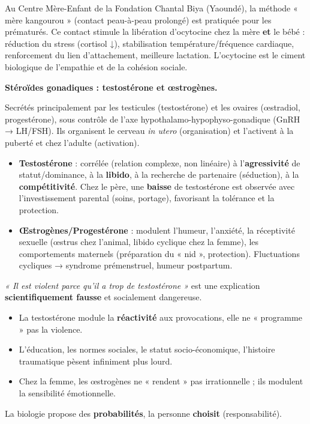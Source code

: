 \documentclass[11pt]{article}
\newcommand{\cle}[1]{{\popxbold\color{popdark}#1}}
\begin{document}
\begin{exemplebox}
Au Centre Mère-Enfant de la Fondation Chantal Biya (Yaoundé), la méthode « mère kangourou » (contact peau-à-peau prolongé) est pratiquée pour les prématurés. Ce contact stimule la libération d'ocytocine chez la mère \textbf{et} le bébé : réduction du stress (cortisol ↓), stabilisation température/fréquence cardiaque, renforcement du lien d'attachement, meilleure lactation. L'ocytocine est le ciment biologique de l'empathie et de la cohésion sociale.
\end{exemplebox}

\textbf{Stéroïdes gonadiques : testostérone et œstrogènes.}\par

Secrétés principalement par les \cle{testicules} (testostérone) et les \cle{ovaires} (œstradiol, progestérone), sous contrôle de l'axe \cle{hypothalamo-hypophyso-gonadique} (GnRH → LH/FSH). Ils organisent le cerveau \emph{in utero} (organisation) et l'activent à la puberté et chez l'adulte (activation).

\begin{propriete}
\begin{itemize}
    \item \textbf{Testostérone} : corrélée (relation complexe, non linéaire) à l'\textbf{agressivité} de statut/dominance, à la \textbf{libido}, à la recherche de partenaire (séduction), à la \textbf{compétitivité}. Chez le père, une \textbf{baisse} de testostérone est observée avec l'investissement parental (soins, portage), favorisant la tolérance et la protection.
    \item \textbf{Œstrogènes/Progestérone} : modulent l'humeur, l'anxiété, la réceptivité sexuelle (œstrus chez l'animal, libido cyclique chez la femme), les comportements maternels (préparation du « nid », protection). Fluctuations cycliques → syndrome prémenstruel, humeur postpartum.
\end{itemize}
\end{propriete}

\begin{attention}
\emph{« Il est violent parce qu'il a trop de testostérone »} est une explication \textbf{scientifiquement fausse} et socialement dangereuse.
\begin{itemize}
    \item La testostérone module la \textbf{réactivité} aux provocations, elle ne « programme » pas la violence.
    \item L'éducation, les normes sociales, le statut socio-économique, l'histoire traumatique pèsent infiniment plus lourd.
    \item Chez la femme, les œstrogènes ne « rendent » pas irrationnelle ; ils modulent la sensibilité émotionnelle.
\end{itemize}
La biologie propose des \textbf{probabilités}, la personne \textbf{choisit} (responsabilité).
\end{attention}
\end{document}
